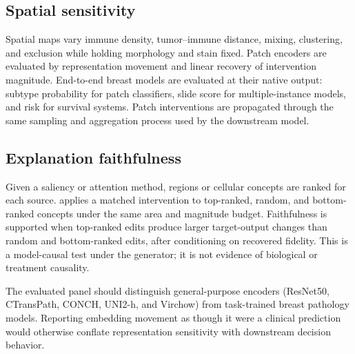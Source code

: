 \subsection{Spatial sensitivity}

Spatial maps vary immune density, tumor--immune distance, mixing, clustering, and exclusion while holding morphology and stain fixed. Patch encoders are evaluated by representation movement and linear recovery of intervention magnitude. End-to-end breast models are evaluated at their native output: subtype probability for patch classifiers, slide score for multiple-instance models, and risk for survival systems. Patch interventions are propagated through the same sampling and aggregation process used by the downstream model.

\subsection{Explanation faithfulness}

Given a saliency or attention method, regions or cellular concepts are ranked for each source. \method{} applies a matched intervention to top-ranked, random, and bottom-ranked concepts under the same area and magnitude budget. Faithfulness is supported when top-ranked edits produce larger target-output changes than random and bottom-ranked edits, after conditioning on recovered fidelity. This is a model-causal test under the generator; it is not evidence of biological or treatment causality.

The evaluated panel should distinguish general-purpose encoders (ResNet50, CTransPath, CONCH, UNI2-h, and Virchow) from task-trained breast pathology models. Reporting embedding movement as though it were a clinical prediction would otherwise conflate representation sensitivity with downstream decision behavior.
